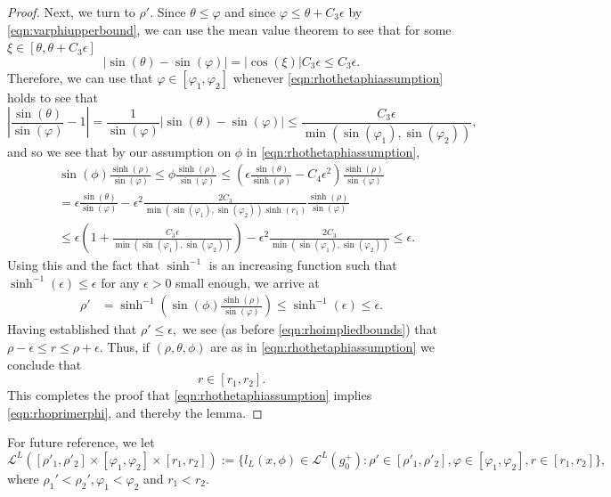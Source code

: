 \documentclass[10pt,a4paper]{amsart}
\newcommand{\CL}{{\mathcal{L}}}
\begin{document}
\begin{proof}
Next, we turn to $\rho'$. 
Since $\theta \leq \varphi$ and since $\varphi \leq \theta+C_3\epsilon$ by
\eqref{eqn:varphiupperbound}, we can use the mean value theorem
to see that for some $\xi\in[\theta,\theta+C_3\epsilon]$
\[
|\sin(\theta)-\sin(\varphi)|=|\cos(\xi)| C_3 \epsilon \leq C_3 \epsilon.
\]
Therefore, we can use that $\varphi\in[\varphi_1,\varphi_2]$ whenever 
\eqref{eqn:rhothetaphiassumption} holds to see that
\[
\left|\frac{\sin(\theta)}{\sin(\varphi)}-1\right|
=\frac{1}{\sin(\varphi)}\left|\sin(\theta)-\sin(\varphi)\right|
\leq \frac{C_3 \epsilon}{\min(\sin(\varphi_1),\sin(\varphi_2))},
\]
and so we see that by our assumption on $\phi$ in \eqref{eqn:rhothetaphiassumption},
\begin{align}
& \sin(\phi) \frac{\sinh(\rho)}{\sin(\varphi)}
\leq \phi \frac{\sinh(\rho)}{\sin(\varphi)}
\leq \left(\epsilon\frac{\sin(\theta)}{\sinh(\rho)}-C_4\epsilon^2 \right)
\frac{\sinh(\rho)}{\sin(\varphi)} \\
& =\epsilon\frac{\sin(\theta)}{\sin(\varphi)}
-\epsilon^2 \frac{2C_3}{\min(\sin(\varphi_1),\sin(\varphi_2))\sinh(r_1)}
\frac{\sinh(\rho)}{\sin(\varphi)} \nonumber\\
& \leq \epsilon\left(1+\frac{C_3 \epsilon}{\min(\sin(\varphi_1),\sin(\varphi_2))}\right)
-\epsilon^2 \frac{2C_3}{\min(\sin(\varphi_1),\sin(\varphi_2))}
\leq \epsilon.
\nonumber
\end{align}
Using this and the fact that $\sinh^{-1}$ is an increasing function 
such that $\sinh^{-1}(\epsilon)\leq \epsilon$
for any $\epsilon>0$ small enough, we arrive at 
\begin{align*}
\rho'& =\sinh^{-1}\left(\sin(\phi) \frac{\sinh(\rho)}{\sin(\varphi)}\right)    
\leq \sinh^{-1}\left(\epsilon\right)  \leq  \epsilon.
\end{align*}
Having established that $\rho'\leq \epsilon,$ we see (as before \eqref{eqn:rhoimpliedbounds})
that $\rho-\epsilon \leq r \leq \rho+\epsilon.$ Thus, if $(\rho,\theta,\phi)$ are as in 
\eqref{eqn:rhothetaphiassumption} we conclude that 
\[
r\in[r_1,r_2].
\]
This completes the proof that \eqref{eqn:rhothetaphiassumption} implies 
\eqref{eqn:rhoprimerphi}, and thereby the lemma.
\end{proof}

For future reference, we let
\begin{equation} \label{eqn:defCL_alt}
\CL^L([\rho'_1,\rho'_2]\times[\varphi_1,\varphi_2]\times[r_1,r_2]) 
:=\{l_L(x,\phi)\in \CL^L(g_0^+): 
\rho'\in [\rho'_1,\rho'_2], \varphi \in [\varphi_1,\varphi_2], r\in[r_1,r_2]\},   
\end{equation}
where $\rho_1'<\rho_2', \varphi_1<\varphi_2$ and $r_1<r_2.$ 
\end{document}
